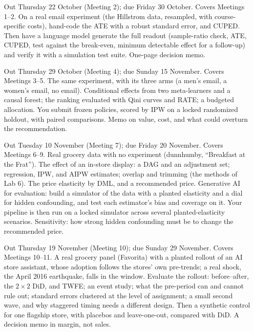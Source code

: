 \documentclass[11pt]{article}
\begin{document}
\begin{description}[leftmargin=1.5em, style=nextline]
\item[A1: Write once, then delegate] Out Thursday 22 October (Meeting 2); due Friday 30 October.
Covers Meetings 1--2. On a real email experiment (the Hillstrom data, resampled, with course-specific
costs), hand-code the ATE with a robust standard error, and
CUPED. Then have a language model generate the full readout (sample-ratio check, ATE, CUPED, test
against the break-even, minimum detectable effect for a follow-up) and verify it with a simulation
test suite. One-page decision memo.
\item[A2: Email whom, and at what budget?] Out Thursday 29 October (Meeting 4); due Sunday 15
November. Covers Meetings 3--5. The same experiment, with its three arms (a men's email, a women's
email, no email). Conditional effects from two meta-learners and a causal forest; the ranking evaluated
with Qini curves and RATE; a budgeted allocation. You submit frozen policies,
scored by IPW on a locked randomized holdout, with paired comparisons. Memo on value, cost, and what
could overturn the recommendation.
\item[A3: Promote and price from the logs] Out Tuesday 10 November (Meeting 7); due Friday 20
November. Covers Meetings 6--9. Real grocery data with no experiment (dunnhumby, ``Breakfast at the
Frat''). The effect of an in-store display: a DAG and an adjustment set; regression, IPW, and AIPW
estimates; overlap and trimming (the methods of Lab 6). The price elasticity by DML, and a recommended
price. Generative AI for evaluation: build a simulator of the data with a planted elasticity and a dial
for hidden confounding, and test each estimator's bias and coverage on it. Your pipeline is then run on
a locked simulator across several planted-elasticity scenarios. Sensitivity: how strong hidden
confounding must be to change the recommended price.
\item[A4: Did the AI assistant pay?] Out Thursday 19 November (Meeting 10); due Sunday 29 November.
Covers Meetings 10--11. A real grocery panel (Favorita) with a planted rollout of an AI store assistant,
whose adoption follows the stores' own pre-trends; a real shock, the April 2016 earthquake, falls in the
window. Evaluate the rollout: before--after, the $2 \times
2$ DiD, and TWFE; an event study; what the pre-period can and cannot rule out; standard errors
clustered at the level of assignment; a small second wave, and why staggered timing needs a
different design. Then a
synthetic control for one flagship store, with placebos and leave-one-out, compared with DiD. A
decision memo in margin, not sales.
\end{description}
\end{document}
